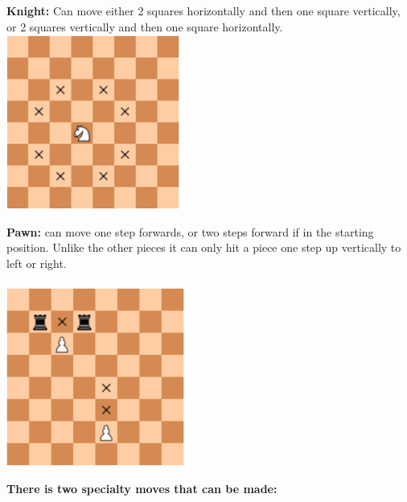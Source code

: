 \documentclass{article}
\begin{document}
\noindent
\textbf{Knight:} Can move either 2 squares horizontally and then one square vertically, or 2 squares 
vertically and then one square horizontally. 
\\
\includegraphics{sex}

\newpage
\noindent
\textbf{Pawn:} can move one step forwards, or two steps forward if in the starting position. Unlike the other pieces it can only hit a piece one step up vertically to left or right. 
\\\\
\includegraphics{sju}

\newpage
\noindent

\textbf{There is two specialty moves that can be made:} 
\end{document}
